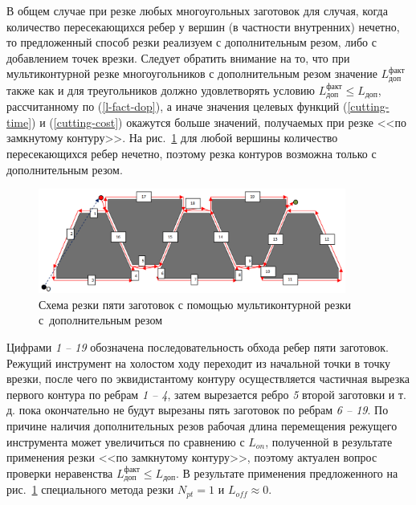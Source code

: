 \documentclass[11pt,twoside,openany]{report}
\begin{document}
В общем случае при резке любых многоугольных
заготовок для случая,
когда количество пересекающихся ребер у вершин
(в частности внутренних) нечетно,
то предложенный способ резки реализуем с
дополнительным резом, либо с добавлением точек врезки.
Следует обратить внимание на то,
что при мультиконтурной резке многоугольников с
дополнительным резом значение
$L_\text{доп}^\text{факт}$
также как и для треугольников должно удовлетворять условию
$L_\text{доп}^\text{факт} \leqslant L_\text{доп}$,
рассчитанному по (\ref{l-fact-dop}),
а иначе значения целевых функций (\ref{cutting-time})
и (\ref{cutting-cost})
окажутся больше значений,
получаемых  при резке <<по замкнутому контуру>>.
На рис.~\ref{5-extra}
для любой вершины количество пересекающихся ребер нечетно,
поэтому резка контуров возможна только с дополнительным резом.

\begin{figure}[h]
  \begin{center}
  \includegraphics[width=0.9\textwidth]{5-extra.png}
  \caption{
    Схема резки пяти заготовок
    с помощью мультиконтурной резки
    с~дополнительным резом
    }
  \label{5-extra}
  \end{center}
\end{figure}

Цифрами {\it 1 -- 19} обозначена последовательность обхода ребер
пяти заготовок.
Режущий инструмент на холостом ходу переходит
из начальной точки в точку врезки,
после чего по эквидистантому контуру
осуществляется частичная вырезка первого
контура по ребрам {\it 1 -- 4},
затем вырезается ребро {\it 5} второй заготовки и т. д.
пока окончательно не будут вырезаны пять заготовок по ребрам
{\it 6 -- 19}.
По причине наличия дополнительных резов рабочая
длина перемещения режущего инструмента может увеличиться по сравнению с $L_{on}$,
полученной в результате применения резки <<по замкнутому контуру>>,
поэтому актуален вопрос проверки неравенства
$L_\text{доп}^\text{факт} \leqslant L_\text{доп}$.
В результате применения предложенного на рис.~\ref{5-extra}
специального метода резки
$N_{pt}=1$
и $L_{off} \approx 0$.
\end{document}
